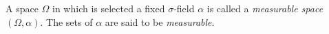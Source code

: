 A space $\Omega$ in which is selected a fixed $\sigma$-field $\alpha$ is called a \textit{measurable space} $(\Omega, \alpha)$. The sets of $\alpha$ are said to be \textit{measurable}.
